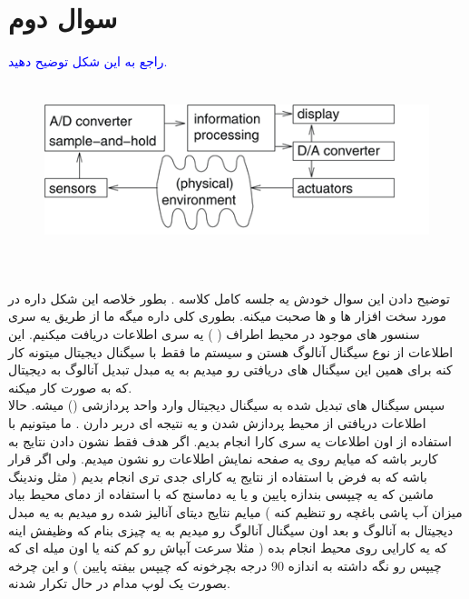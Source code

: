 \documentclass[12pt,a4paper]{article}							   %
\begin{document}
\section{سوال دوم }
	\begin{RTL}
			\textcolor{blue}{
راجع به این شکل توضیح دهید.  \\
			}
		\begin{figure}[h!]
		\centering
		\includegraphics*[height=5cm]{img1}
		\end{figure}
\\
توضیح دادن این سوال خودش یه جلسه کامل کلاسه
\smiley{}
. بطور خلاصه این شکل داره در مورد سخت افزار 
   ها و 
  ها صحبت میکنه. بطوری کلی داره میگه ما از طریق یه سری  سنسور های موجود در محیط اطراف
( )
  یه سری اطلاعات دریافت میکنیم. این اطلاعات از نوع سیگنال آنالوگ هستن و سیستم ما فقط با سیگنال دیجیتال میتونه کار کنه برای همین این سیگنال های دریافتی رو میدیم به یه مبدل تبدیل آنالوگ به دیجیتال که به صورت
   کار میکنه. \\
سپس سیگنال های تبدیل شده به سیگنال دیجیتال وارد واحد پردازشی
()
  میشه. حالا اطلاعات دریافتی از محیط پردازش شدن و یه نتیجه ای دربر دارن . ما میتونیم با استفاده از اون اطلاعات یه سری کارا انجام بدیم. اگر هدف فقط نشون دادن نتایج به کاربر باشه که میایم روی یه صفحه نمایش 
 اطلاعات رو نشون میدیم. ولی اگر قرار باشه که به فرض با استفاده از نتایج یه کارای جدی تری انجام بدیم ( مثل وندینگ ماشین که یه چیپسی بندازه پایین و یا یه دماسنج که با استفاده از دمای محیط بیاد میزان آب پاشی باغچه رو تنظیم کنه ) میایم نتایج دیتای آنالیز شده رو میدیم به یه مبدل دیجیتال به آنالوگ و بعد اون سیگنال آنالوگ رو میدیم به یه چیزی بنام
 که وظیفش اینه که یه کارایی روی محیط انجام بده ( مثلا سرعت آبپاش رو کم کنه یا اون میله ای که چیپس رو نگه داشته به اندازه 90 درجه بچرخونه که چیپس بیفته پایین ) و این چرخه بصورت یک لوپ مدام در حال تکرار شدنه.
	\end{RTL}
\newpage

\end{document}
